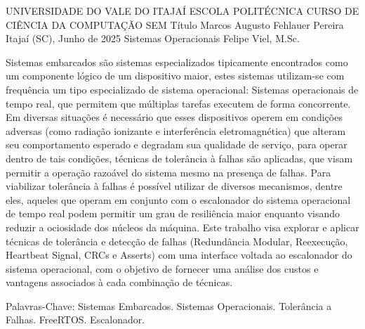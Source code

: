 
\begin{Info}
{UNIVERSIDADE DO VALE DO ITAJAÍ}
{ESCOLA POLITÉCNICA}
{CURSO DE CIÊNCIA DA COMPUTAÇÃO}
{SEM Título}
{Marcos Augusto Fehlauer Pereira}
{Itajaí (SC), Junho de 2025}
{Sistemas Operacionais}
{Felipe Viel, M.Sc.}
{}
\end{Info}




\begin{Resumo}
Sistemas embarcados são sistemas especializados tipicamente encontrados como um componente lógico de um dispositivo maior, estes sistemas utilizam-se com frequência um tipo especializado de sistema operacional: Sistemas operacionais de tempo real, que permitem que múltiplas tarefas executem de forma concorrente. Em diversas situações é necessário que esses dispositivos operem em condições adversas (como radiação ionizante e interferência eletromagnética) que alteram seu comportamento esperado e degradam sua qualidade de serviço, para operar dentro de tais condições, técnicas de tolerância à falhas são aplicadas, que visam permitir a operação razoável do sistema mesmo na presença de falhas. Para viabilizar tolerância à falhas é possível utilizar de diversos mecanismos, dentre eles, aqueles que operam em conjunto com o escalonador do sistema operacional de tempo real podem permitir um grau de resiliência maior enquanto visando reduzir a ociosidade dos núcleos da máquina. Este trabalho visa explorar e aplicar técnicas de tolerância e detecção de falhas (Redundância Modular, Reexecução, Heartbeat Signal, CRCs e Asserts) com uma interface voltada ao escalonador do sistema operacional, com o objetivo de fornecer uma análise dos custos e vantagens associados à cada combinação de técnicas.

Palavras-Chave: Sistemas Embarcados. Sistemas Operacionais. Tolerância a Falhas. FreeRTOS. Escalonador.
\end{Resumo}

